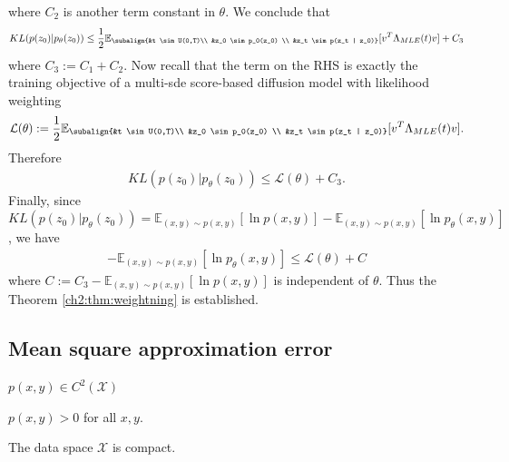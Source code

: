 where $C_2$ is another term constant in $\theta$.
We conclude that 
\begin{align*}
    KL(p(z_0) | p_\theta(z_0)) \leq \frac{1}{2} \mathbb{E}_{\subalign{&t \sim U(0,T)\\ &z_0 \sim p_0(z_0) \\ &z_t \sim p(z_t | z_0)}} 
    [
        v^T \Lambda_{MLE}(t) v
    ] + C_3
\end{align*}
where $C_3 := C_1 + C_2$.
Now recall that the term on the RHS is exactly the training objective of a multi-sde score-based diffusion model with likelihood weighting
\begin{gather*}
    \begin{aligned}
        \mathcal{L}(\theta) := \frac{1}{2} \mathbb{E}_{\subalign{&t \sim U(0,T)\\ &z_0 \sim p_0(z_0) \\ &z_t \sim p(z_t | z_0)}} 
        [
            v^T \Lambda_{MLE}(t) v
        ].
    \end{aligned}
\end{gather*}
Therefore
\begin{align*}
    KL(p(z_0) | p_\theta(z_0)) \leq \mathcal{L}(\theta)  + C_3.
\end{align*}
Finally, since $KL(p(z_0) | p_\theta(z_0))  = \mathbb{E}_{(x,y) \sim p(x,y)}[\ln p(x,y)]  - \mathbb{E}_{(x,y) \sim p(x,y)}[\ln p_\theta(x,y)]$, we have 
\begin{gather*}
    -\mathbb{E}_{(x,y) \sim p(x,y)}[\ln p_\theta(x,y)] \leq \mathcal{L}(\theta) + C
\end{gather*}
where $C := C_3 - \mathbb{E}_{(x,y) \sim p(x,y)}[\ln p(x,y)] $ is independent of $\theta$. Thus the Theorem \ref{ch2:thm:weightning} is established.

\subsection{Mean square approximation error}
\label{ch2:appendix:mse}

\begin{assumption}
    \label{ch2:assum:_c2}
    $p(x,y) \in C^2(\mathcal{X})$\
\end{assumption}
\begin{assumption}
    \label{ch2:assum:_lower_bound}
    $p(x,y) > 0$ for all $x,y$.
\end{assumption}
\begin{assumption}
    \label{ch2:assum:_compact_2}
    The data space $\mathcal{X}$ is compact.
\end{assumption}

